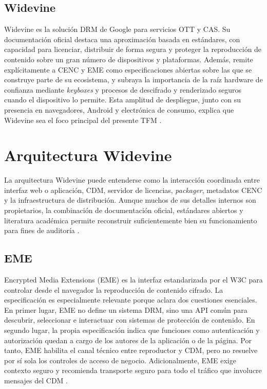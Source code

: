 \subsection{Widevine}

Widevine es la solución DRM de Google para servicios OTT y CAS. Su documentación oficial destaca una aproximación basada en estándares, con capacidad para licenciar, distribuir de forma segura y proteger la reproducción de contenido sobre un gran número de dispositivos y plataformas. Además, remite explícitamente a CENC y EME como especificaciones abiertas sobre las que se construye parte de su ecosistema, y subraya la importancia de la raíz hardware de confianza mediante \textit{keyboxes} y procesos de descifrado y renderizado seguros cuando el dispositivo lo permite. Esta amplitud de despliegue, junto con su presencia en navegadores, Android y electrónica de consumo, explica que Widevine sea el foco principal del presente TFM \cite{widevine2024,patat2022}.

\section{Arquitectura Widevine}

La arquitectura Widevine puede entenderse como la interacción coordinada entre interfaz web o aplicación, CDM, servidor de licencias, \textit{packager}, metadatos CENC y la infraestructura de distribución. Aunque muchos de sus detalles internos son propietarios, la combinación de documentación oficial, estándares abiertos y literatura académica permite reconstruir suficientemente bien su funcionamiento para fines de auditoría \cite{w3ceme2026,widevine2024,patat2022}.

\subsection{EME}

Encrypted Media Extensions (EME) es la interfaz estandarizada por el W3C para controlar desde el navegador la reproducción de contenido cifrado. La especificación es especialmente relevante porque aclara dos cuestiones esenciales. En primer lugar, EME no define un sistema DRM, sino una API común para descubrir, seleccionar e interactuar con sistemas de protección de contenido. En segundo lugar, la propia especificación indica que funciones como autenticación y autorización quedan a cargo de los autores de la aplicación o de la página. Por tanto, EME habilita el canal técnico entre reproductor y CDM, pero no resuelve por sí sola los controles de acceso de negocio. Adicionalmente, EME exige contexto seguro y recomienda transporte seguro para todo el tráfico que involucre mensajes del CDM \cite{w3ceme2026}.

